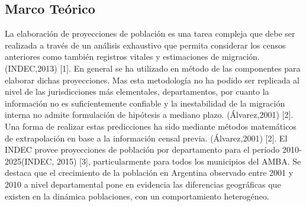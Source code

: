 \documentclass{article}
\theoremstyle{mytheoremstyle}
\theoremstyle{mytheoremstyle}
\theoremstyle{myproblemstyle}
\begin{document}
  \subsection{Marco Teórico}
  La elaboración de proyecciones de población es una tarea compleja que debe ser realizada a través de un análisis exhaustivo que permita considerar los censos anteriores como también registros vitales y estimaciones de migración. (INDEC,2013) [1]. En general se ha utilizado en método de las componentes para elaborar dichas proyecciones. Mas esta metodología no ha podido ser replicada al nivel de las jurisdicciones más elementales, departamentos, por cuanto la información no es suficientemente confiable y la inestabilidad de la migración interna no admite formulación de hipótesis a mediano plazo. (Álvarez,2001) [2]. Una forma de realizar estas predicciones ha sido mediante métodos matemáticos de extrapolación en base a la información censal previa. (Álvarez,2001) [2].
  El INDEC provee proyecciones de población por departamento para el período 2010-2025(INDEC, 2015) [3], particularmente para todos los municipios del AMBA. Se destaca que el crecimiento de la población en Argentina observado entre 2001 y 2010 a nivel departamental pone en evidencia las diferencias geográficas que existen en la dinámica poblaciones, con un comportamiento heterogéneo.
  
\end{document}
